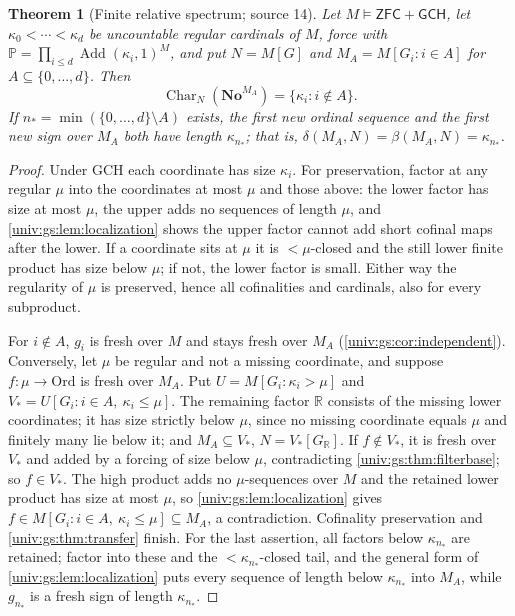 \documentclass[11pt,letterpaper]{article}
\numberwithin{equation}{section}
\newtheorem{theorem}{Theorem}[section]
\theoremstyle{definition}
\theoremstyle{remark}
\newcommand{\No}{\mathbf{No}}
\newcommand{\Ord}{\mathrm{Ord}}
\newcommand{\Add}{\operatorname{Add}}
\newcommand{\ZFC}{\mathsf{ZFC}}
\newcommand{\Char}{\operatorname{Char}}
\newcommand{\GCH}{\mathsf{GCH}}
\begin{document}
\begin{theorem}[Finite relative spectrum; source 14]\label{univ:gs:thm:cube}
Let $M\models\ZFC+\GCH$, let $\kappa_0<\cdots<\kappa_d$ be uncountable regular cardinals
of $M$, force with $\mathbb P=\prod_{i\le d}\Add(\kappa_i,1)^M$, and put $N=M[G]$ and
$M_A=M[G_i:i\in A]$ for $A\subseteq\{0,\ldots,d\}$. Then
\[
 \Char_N(\No^{M_A})=\{\kappa_i:i\notin A\}.
\]
If $n_*=\min(\{0,\ldots,d\}\setminus A)$ exists, the first new ordinal sequence and the
first new sign over $M_A$ both have length $\kappa_{n_*}$; that is,
$\delta(M_A,N)=\beta(M_A,N)=\kappa_{n_*}$.
\end{theorem}
\begin{proof}
Under GCH each coordinate has size $\kappa_i$. For preservation, factor at any regular
$\mu$ into the coordinates at most $\mu$ and those above: the lower factor has size at
most $\mu$, the upper adds no sequences of length $\mu$, and
\cref{univ:gs:lem:localization} shows the upper factor cannot add short cofinal maps
after the lower. If a coordinate sits at $\mu$ it is $<\mu$-closed and the still lower
finite product has size below $\mu$; if not, the lower factor is small. Either way the
regularity of $\mu$ is preserved, hence all cofinalities and cardinals, also for every
subproduct.

For $i\notin A$, $g_i$ is fresh over $M$ and stays fresh over $M_A$
(\cref{univ:gs:cor:independent}). Conversely, let $\mu$ be regular and not a missing
coordinate, and suppose $f:\mu\to\Ord$ is fresh over $M_A$. Put
$U=M[G_i:\kappa_i>\mu]$ and $V_*=U[G_i:i\in A,\ \kappa_i\le\mu]$. The remaining factor
$\mathbb R$ consists of the missing lower coordinates; it has size strictly below $\mu$,
since no missing coordinate equals $\mu$ and finitely many lie below it; and
$M_A\subseteq V_*$, $N=V_*[G_{\mathbb R}]$. If $f\notin V_*$, it is fresh over $V_*$ and
added by a forcing of size below $\mu$, contradicting \cref{univ:gs:thm:filterbase}; so
$f\in V_*$. The high product adds no $\mu$-sequences over $M$ and the retained lower
product has size at most $\mu$, so \cref{univ:gs:lem:localization} gives
$f\in M[G_i:i\in A,\ \kappa_i\le\mu]\subseteq M_A$, a contradiction. Cofinality
preservation and \cref{univ:gs:thm:transfer} finish. For the last assertion, all factors
below $\kappa_{n_*}$ are retained; factor into these and the $<\kappa_{n_*}$-closed tail,
and the general form of \cref{univ:gs:lem:localization} puts every sequence of length
below $\kappa_{n_*}$ into $M_A$, while $g_{n_*}$ is a fresh sign of length
$\kappa_{n_*}$.
\end{proof}
\end{document}
